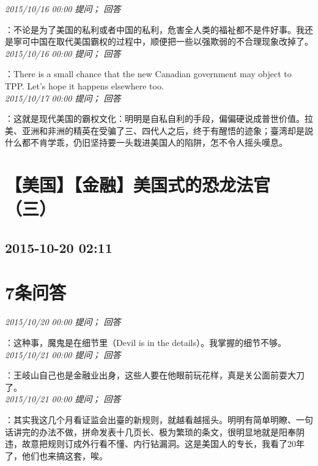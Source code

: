 \documentclass[twocolumn]{ctexart}
\begin{document}
\textit{\hfill\noindent\small 2015/10/16 00:00 提问； 回答}

：不论是为了美国的私利或者中国的私利，危害全人类的福祉都不是件好事。我还是寧可中国在取代美国霸权的过程中，顺便把一些以强欺弱的不合理现象改掉了。\\

\textit{\hfill\noindent\small 2015/10/16 00:00 提问； 回答}

：There is a small chance that the new Canadian government may object to TPP. Let's hope it happens elsewhere too.\\

\textit{\hfill\noindent\small 2015/10/17 00:00 提问； 回答}

：这就是现代美国的霸权文化：明明是自私自利的手段，偏偏硬说成普世价值。拉美、亚洲和非洲的精英在受骗了三、四代人之后，终于有醒悟的迹象；臺湾却是説什么都不肯学乖，仍旧坚持要一头栽进美国人的陷阱，怎不令人摇头嘆息。\\


\section{【美国】【金融】美国式的恐龙法官（三）}
\subsection{2015-10-20 02:11}


\section{7条问答}

\textit{\hfill\noindent\small 2015/10/20 00:00 提问； 回答}

：这种事，魔鬼是在细节里（Devil is in the details）。我掌握的细节不够。\\

\textit{\hfill\noindent\small 2015/10/21 00:00 提问； 回答}

：王岐山自己也是金融业出身，这些人要在他眼前玩花样，真是关公面前耍大刀了。\\

\textit{\hfill\noindent\small 2015/10/21 00:00 提问； 回答}

：其实我这几个月看证监会出臺的新规则，就越看越摇头。明明有简单明瞭、一句话讲完的办法不做，拼命发表十几页长、极为繁琐的条文，很明显地就是阳奉阴违，故意把规则订成外行看不懂、内行钻漏洞。这是美国人的专长，我看了20年了，他们也来搞这套，唉。\\
\end{document}
